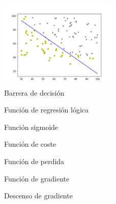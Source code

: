 \documentclass[6pt]{AiTex}
\begin{document}
\begin{figure}[H]
    \centering
    \includegraphics[width=0.5\textwidth]{./imagenes/muestreo1_sim.png}
    \caption{Barrera de decisión}
    \label{fig:decision_boundary1}
\end{figure}

\begin{figure}[H]
    \centering
    
    \caption{Función de regresión lógica}
    \label{fig:function}
\end{figure}

\begin{figure}[H]
    \centering
    
    \caption{Función sigmoide}
    \label{fig:sigmoid}
\end{figure}

\begin{figure}[H]
    \centering
    
    \caption{Función de coste}
    \label{fig:cost}
\end{figure}

\begin{figure}[H]
    \centering
    
    \caption{Función de perdida}
    \label{fig:loss}
\end{figure}

\begin{figure}[H]
    \centering
    
    \caption{Función de gradiente}
    \label{fig:grad}
\end{figure}

\begin{figure}[H]
    \centering
    
    \caption{Descenso de gradiente}
    \label{fig:gradient_descent}
\end{figure}
\end{document}
